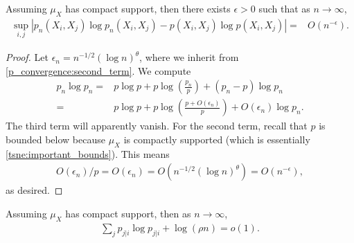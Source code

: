 \begin{lemma} \label{tsne:plogp_convergence_lemma}
    Assuming $\mu_X$ has compact support, then there exists $\epsilon>0$ such that as $n \to \infty$,
    \begin{align}
        \sup_{i,j}|p_n(X_i,X_j)\log p_n(X_i,X_j) - p(X_i,X_j)\log p(X_i,X_j)| = & O(n^{-\epsilon}). \nonumber
    \end{align}
\end{lemma}
\begin{proof}
    Let $\epsilon_n = n^{-1/2} (\log n)^{\theta}$, where we inherit from \eqref{p_convergence:second_term}. We compute
    \begin{align}
        p_n \log p_n = & p \log p + p \log \left(\frac{p_n}{p}\right) + (p_n-p)\log p_n \nonumber           \\
        =              & p \log p + p \log \left(\frac{p+ O(\epsilon_n)}{p}\right) + O(\epsilon_n)\log p_n.
    \end{align}
    The third term will apparently vanish. For the second term, recall that $p$ is bounded below because $\mu_X$ is compactly supported (which is essentially \eqref{tsne:important_bounds}). This means
    \begin{align} \label{p_convergence:entropy_bound}
        O(\epsilon_n)/p = O(\epsilon_n) = O(n^{-1/2} (\log n)^{\theta}) = O(n^{-\epsilon}),
    \end{align}
    as desired.
\end{proof}
\begin{lemma}
    Assuming $\mu_X$ has compact support, then as $n \to \infty$,
    \begin{align}
        \sum_j p_{j|i} \log p_{j|i} + \log(\rho n) = o(1).
    \end{align}
\end{lemma}
